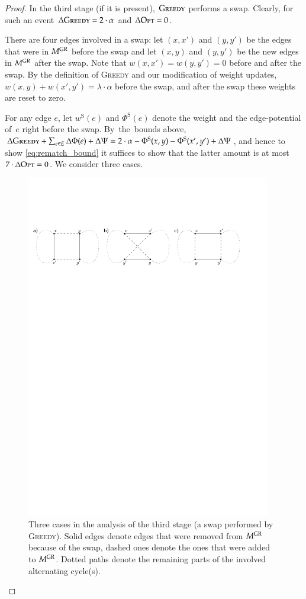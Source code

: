 \documentclass[11pt,a4paper]{scrartcl}
\newcommand{\GREEDY}{\textsc{Greedy}\xspace}
\newcommand{\MGREEDY}{M^\textsc{GR}}
\newcommand{\OPT}{\textsc{Opt}\xspace}
\newcommand{\Phiinit}{\Phi^\textrm{S}}
\newcommand{\winit}{w^\textrm{S}}
\begin{document}
\begin{proof}
In the third stage (if it is present), $\GREEDY$ performs a swap. Clearly, for
such an event $\Delta \GREEDY = 2 \cdot \alpha$ and $\Delta \OPT = 0$. 

There are four edges involved in a swap: let $(x,x')$ and $(y,y')$ be the
edges that were in $\MGREEDY$ before the swap and let $(x,y)$ and $(y,y')$ be
the new edges in $\MGREEDY$ after the swap. Note that $w(x,x') = w(y,y') = 0$
before and after the swap. By the definition of \GREEDY and our modification
of weight updates, $w(x,y) + w(x',y') = \lambda
\cdot \alpha$ before the swap, and after the swap these weights are reset to
zero.

For any edge $e$, let $\winit(e)$ and $\Phiinit(e)$ denote the weight and the
edge-potential of~$e$ right before the swap. By~the~bounds above, $\Delta
\GREEDY + \sum_{e \in E} \Delta \Phi(e) + \Delta\Psi = 2 \cdot \alpha -
\Phiinit(x,y) - \Phiinit(x',y') + \Delta \Psi$, and hence to show
\eqref{eq:rematch_bound} it suffices to show that the latter amount is at most
$7 \cdot \Delta \OPT = 0$. We consider three cases.

\begin{figure}
\centering
\includegraphics[width=0.95\textwidth]{fig_rematch}
\caption{Three cases in the analysis of the third stage (a swap performed by
\GREEDY). Solid edges denote edges that were removed from $\MGREEDY$ because
of the swap, dashed ones denote the ones that were added to $\MGREEDY$. Dotted
paths denote the remaining parts of the involved alternating cycle(s).}
\label{fig:rematch}
\end{figure}


\end{proof}
\end{document}
